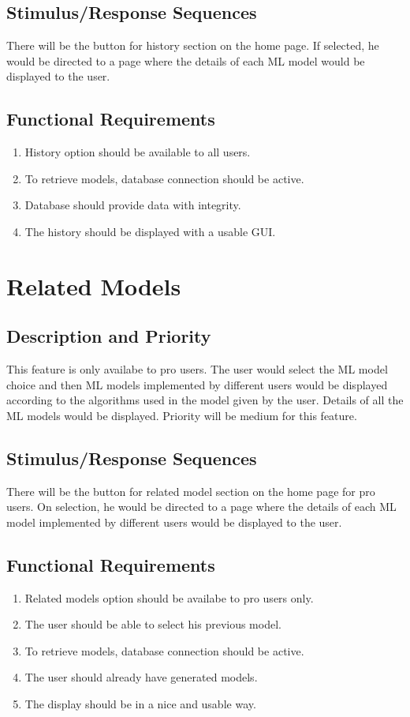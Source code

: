 \documentclass{scrreprt}
\begin{document}
\subsection{Stimulus/Response Sequences}
 There will be the button for history section on the home page. If selected, he would be directed to a page where the details of each ML model would be displayed to the user.

\subsection{Functional Requirements}
\begin{enumerate}
\item History option should be available to all users.
\item To retrieve models, database connection should be active.
\item Database should provide data with integrity.
\item The history should be displayed with a usable GUI.
\end{enumerate}

\section{Related Models}

\subsection{Description and Priority}
This feature is only availabe to pro users.
The user would select the ML model choice and then ML models implemented by different users would be displayed according to the algorithms used in the model given by the user. Details of all the ML models would be displayed. Priority will be medium for this feature.

\subsection{Stimulus/Response Sequences}
 There will be the button for related model section on the home page for pro users. On selection, he would be directed to a page where the details of each ML model implemented by different users would be displayed to the user.

\subsection{Functional Requirements}
\begin{enumerate}
\item Related models option should be availabe to pro users only.
\item The user should be able to select his previous model.
\item To retrieve models, database connection should be active.
\item The user should already have generated models.
\item The display should be in a nice and usable way.
\end{enumerate}
\end{document}
